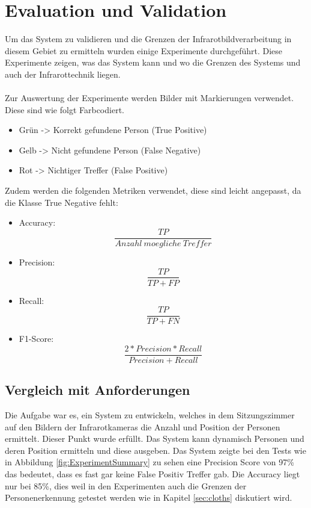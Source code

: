 \chapter{Evaluation und Validation}
\label{ch:Eval}

Um das System zu validieren und die Grenzen der Infrarotbildverarbeitung in diesem Gebiet zu ermitteln wurden einige Experimente durchgeführt. Diese Experimente zeigen, was das System kann und wo die Grenzen des Systems und auch der Infrarottechnik liegen.\\
\\
Zur Auswertung der Experimente werden Bilder mit Markierungen verwendet. Diese sind wie folgt Farbcodiert.

\begin{itemize}
	\item Grün -> Korrekt gefundene Person (True Positive)
	\item Gelb -> Nicht gefundene Person (False Negative)
	\item Rot -> Nichtiger Treffer (False Positive)\\
\end{itemize}
Zudem werden die folgenden Metriken verwendet, diese sind leicht angepasst, da die Klasse True Negative fehlt:

\begin{itemize}
	\item Accuracy: \[\dfrac{TP}{Anzahl\: moegliche\: Treffer}\]
	\item Precision: \[\dfrac{TP}{TP + FP}\]
	\item Recall: \[\dfrac{TP}{TP + FN}\]
	\item F1-Score: \[\dfrac{2*Precision*Recall}{Precision + Recall}\]
\end{itemize}


\section{Vergleich mit Anforderungen}
\label{sec:VergleichAnforderungen}

Die Aufgabe war es, ein System zu entwickeln, welches in dem Sitzungszimmer auf den Bildern der Infrarotkameras die Anzahl und Position der Personen ermittelt. Dieser Punkt wurde erfüllt. Das System kann dynamisch Personen und deren Position ermitteln und diese ausgeben. Das System zeigte bei den Tests wie in Abbildung \ref{fig:ExperimentSummary} zu sehen eine \gls{Precision} Score von 97\% das bedeutet, dass es fast gar keine False Positiv Treffer gab. Die Accuracy liegt nur bei 85\%, dies weil in den Experimenten auch die Grenzen der Personenerkennung getestet werden wie in Kapitel \ref{sec:cloths} diskutiert wird.

